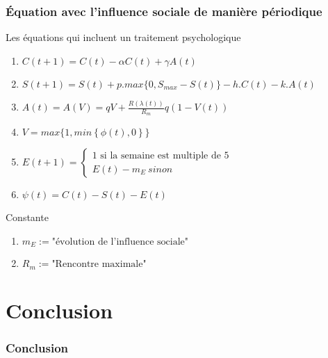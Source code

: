 \documentclass{beamer}
\begin{document}
\begin{frame}
	\frametitle{Équation avec l'influence sociale de manière périodique}
	\begin{block}{Les équations qui incluent un traitement psychologique}
		\begin{enumerate}
			\item $C(t+1) = C(t)- \alpha C(t) + \gamma A(t)$
			\item $S(t+1)=S(t)+p.max\{0,S_{max}-S(t)\}-h.C(t)-k.A(t)$
			\item $A(t)=A(V)=qV+\frac{R(\lambda(t))}{R_m}q\left( 1-V(t)\right) $
			\item $V= max\{1,min\left\lbrace \phi(t),0 \right\rbrace \}$
			\item \alert{$E(t+1)=\begin{cases}
					1 \text{ si la semaine est multiple de 5} \\
					E(t)-m_E \ sinon
				\end{cases}$}
			\item $\psi(t)=C(t)-S(t)-E(t)$
		\end{enumerate}
	\end{block}
	\begin{block}{Constante}
		\begin{enumerate}
			\item $m_E:=\text{"évolution de l'influence sociale"}$ 
			\item $R_m:=\text{"Rencontre maximale"}$
		\end{enumerate}
	\end{block}
\end{frame}


\section{Conclusion}

\begin{frame}
	\frametitle{Conclusion}
\end{frame}
\end{document}
